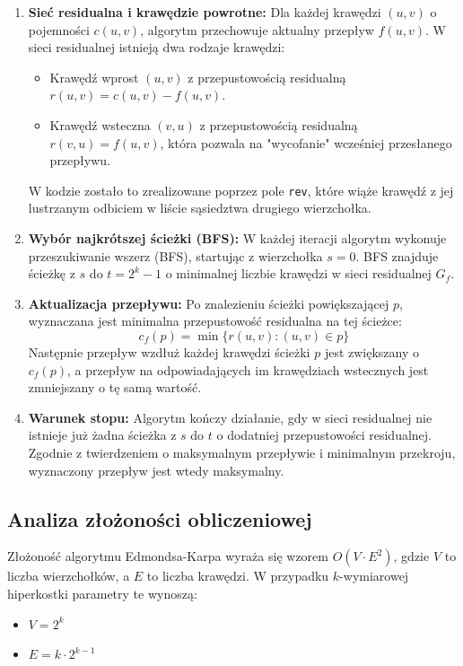 \documentclass[11pt, a4paper]{article}
\begin{document}
\begin{enumerate}
	\item \textbf{Sieć residualna i krawędzie powrotne:} Dla każdej krawędzi $(u, v)$ o pojemności $c(u, v)$, algorytm przechowuje aktualny przepływ $f(u, v)$. W sieci residualnej istnieją dwa rodzaje krawędzi:
	\begin{itemize}
		\item Krawędź wprost $(u, v)$ z przepustowością residualną $r(u, v) = c(u, v) - f(u, v)$.
		\item Krawędź wsteczna $(v, u)$ z przepustowością residualną $r(v, u) = f(u, v)$, która pozwala na "wycofanie" wcześniej przesłanego przepływu.
	\end{itemize}
	W kodzie zostało to zrealizowane poprzez pole \texttt{rev}, które wiąże krawędź z jej lustrzanym odbiciem w liście sąsiedztwa drugiego wierzchołka.
	
	\item \textbf{Wybór najkrótszej ścieżki (BFS):} W każdej iteracji algorytm wykonuje przeszukiwanie wszerz (BFS), startując z wierzchołka $s=0$. BFS znajduje ścieżkę z $s$ do $t=2^k-1$ o minimalnej liczbie krawędzi w sieci residualnej $G_f$. 
	
	\item \textbf{Aktualizacja przepływu:} Po znalezieniu ścieżki powiększającej $p$, wyznaczana jest minimalna przepustowość residualna na tej ścieżce:
	\begin{equation}
		c_f(p) = \min \{ r(u, v) : (u, v) \in p \}
	\end{equation}
	Następnie przepływ wzdłuż każdej krawędzi ścieżki $p$ jest zwiększany o $c_f(p)$, a przepływ na odpowiadających im krawędziach wstecznych jest zmniejszany o tę samą wartość.
	
	\item \textbf{Warunek stopu:} Algorytm kończy działanie, gdy w sieci residualnej nie istnieje już żadna ścieżka z $s$ do $t$ o dodatniej przepustowości residualnej. Zgodnie z twierdzeniem o maksymalnym przepływie i minimalnym przekroju, wyznaczony przepływ jest wtedy maksymalny.
\end{enumerate}
	
	\subsection{Analiza złożoności obliczeniowej}
	
	Złożoność algorytmu Edmondsa-Karpa wyraża się wzorem $O(V \cdot E^2)$, gdzie $V$ to liczba wierzchołków, a $E$ to liczba krawędzi. W przypadku $k$-wymiarowej hiperkostki parametry te wynoszą:
	\begin{itemize}
		\item $V = 2^k$ 
		\item $E = k \cdot 2^{k-1}$ 
	\end{itemize}
	
\end{document}

